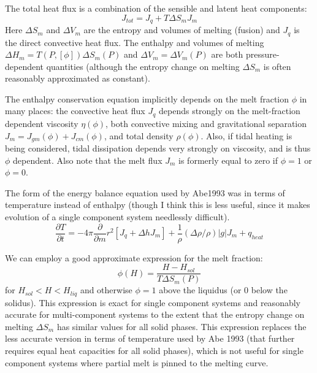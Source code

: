 The total heat flux is a combination of the sensible and latent heat components:
\begin{equation}
  J_{tot} = J_q + T\Delta S_m J_m
\end{equation}
Here $\Delta S_m$ and $\Delta V_m$ are the entropy and volumes of melting (fusion) and $J_q$ is the direct convective heat flux.
The enthalpy and volumes of melting ${\Delta H_m = T(P, [\phi])\Delta S_m(P)}$ and ${\Delta V_m = \Delta V_m(P)}$ are both pressure-dependent quantities (although the entropy change on melting $\Delta S_m$ is often reasonably approximated as constant).

The enthalpy conservation equation implicitly depends on the melt fraction $\phi$ in many places: the convective heat flux $J_q$ depends strongly on the melt-fraction dependent viscosity $\eta(\phi)$, both convective mixing and gravitational separation ${J_m = J_{gm}(\phi) + J_{cm}(\phi)}$, and total density $\rho(\phi)$.
Also, if tidal heating is being considered, tidal dissipation depends very strongly on viscosity, and is thus $\phi$ dependent.
Also note that the melt flux $J_m$ is formerly equal to zero if $\phi=1$ or $\phi=0$.

The form of the energy balance equation used by Abe1993 was in terms of temperature instead of enthalpy (though I think this is less useful, since it makes evolution of a single component system needlessly difficult).
\begin{equation}
  [C_p  + \Delta h (\frac{\partial \phi}{\partial T})_P] \frac{\partial T}{\partial t}= - 4\pi \frac{\partial}{\partial m} r^2[J_q + \Delta h J_m] + \frac{1}{\rho}(\Delta \rho/\rho)|g|J_m + q_{heat}
\end{equation}

We can employ a good approximate expression for the melt fraction:
\begin{equation}
  \phi(H) = \frac{H - H_{sol}}{T\Delta S_m(P)} 
\end{equation}
for $H_{sol} < H < H_{liq}$ and otherwise $\phi = 1$ above the liquidus (or 0 below the solidus).
This expression is exact for single component systems and reasonably accurate for multi-component systems to the extent that the entropy change on melting $\Delta S_m$ has similar values for all solid phases.
This expression replaces the less accurate version in terms of temperature used by Abe 1993 (that further requires equal heat capacities for all solid phases), which is not useful for single component systems where partial melt is pinned to the melting curve.

